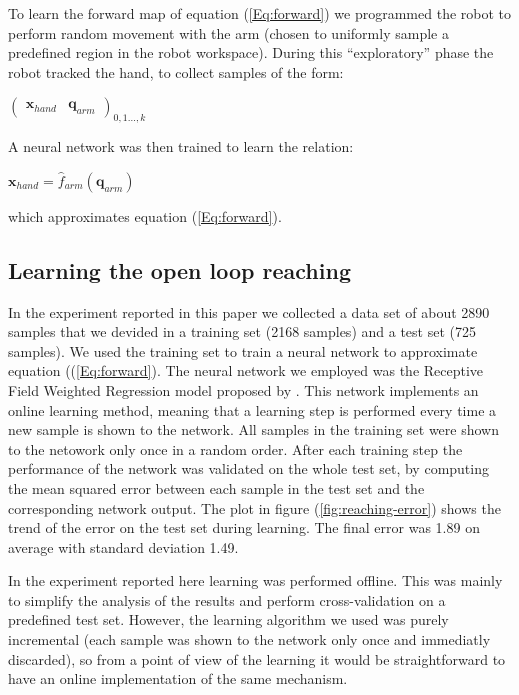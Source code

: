 To learn the forward map of equation (\ref{Eq:forward}) we programmed the robot 
to perform random movement with the arm (chosen to uniformly sample 
a predefined region in the robot workspace). During this ``exploratory'' phase the robot
tracked the hand, to collect samples of the form:
%
\begin{center}
\begin{math}
  \left(\begin{array}{cc}
    \mathbf x_{hand} & \mathbf q_{arm} \end{array}\right)_{0,1\dots,k}
\end{math}
\end{center}
%
A neural network was then trained to learn the relation:
%
\begin{center} 
\begin{math}
  \mathbf x_{hand}=\hat{f}_{arm}\left(\mathbf q_{arm}\right)
\end{math}
\end{center}
%
which approximates equation (\ref{Eq:forward}).

\subsection{Learning the open loop reaching}
\label{sec:learning-open-loop}
%
In the experiment reported in this paper we collected a data set of 
about 2890 samples that we devided in a training set (2168 samples) and 
a test set (725 samples). We used the training set to train a neural 
network to approximate equation ((\ref{Eq:forward}). The neural network 
we employed was the Receptive Field Weighted Regression model proposed 
by \cite{schaal98Constructive}. This network implements an online learning
method, meaning that a learning step is performed every time a new 
sample is shown to the network. All samples in the training set were shown
to the netowork only once in a random order. After each training step the 
performance of the network was validated on the whole test set, by computing
the mean squared error between each sample in the test set and the 
corresponding network output. The plot in figure (\ref{fig:reaching-error})
shows the trend of the error on the test set during learning. The final 
error was 1.89 on average with standard deviation 1.49.

In the experiment reported here learning was performed offline. This was 
mainly to simplify the analysis of the results and perform cross-validation 
on a predefined test set. However, the learning algorithm we used was purely 
incremental (each sample was shown to the network only once and immediatly 
discarded), so from a point of view of the learning it would be 
straightforward to have an online implementation of the same mechanism.

